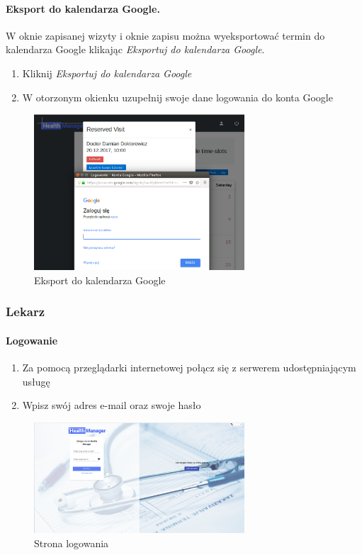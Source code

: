 \documentclass[polish,12pt]{aghthesis}
\begin{document}
    \paragraph{Eksport do kalendarza Google.}{ W oknie zapisanej wizyty i oknie zapisu można wyeksportować termin do kalendarza Google klikając \emph{Eksportuj do kalendarza Google}.
    \begin{enumerate}
      \item Kliknij \emph{Eksportuj do kalendarza Google}
      \item W otorzonym okienku uzupełnij swoje dane logowania do konta Google
    \end{enumerate}
       \begin{figure}[H]
        \includegraphics[width=0.7\textwidth]{gui-google-export}
        \caption{Eksport do kalendarza Google}
        \end{figure}  
    }
\subsubsection{Lekarz}
    \paragraph{Logowanie}{
      \begin{enumerate}
          \item Za pomocą przeglądarki internetowej połącz się z serwerem udostępniającym usługę
          \item Wpisz swój adres e-mail oraz swoje hasło
      \end{enumerate}
      \begin{figure}[H]
          \includegraphics[width=0.7\textwidth]{gui-loginpage}
          \caption{Strona logowania}
      \end{figure}
    }
\end{document}
